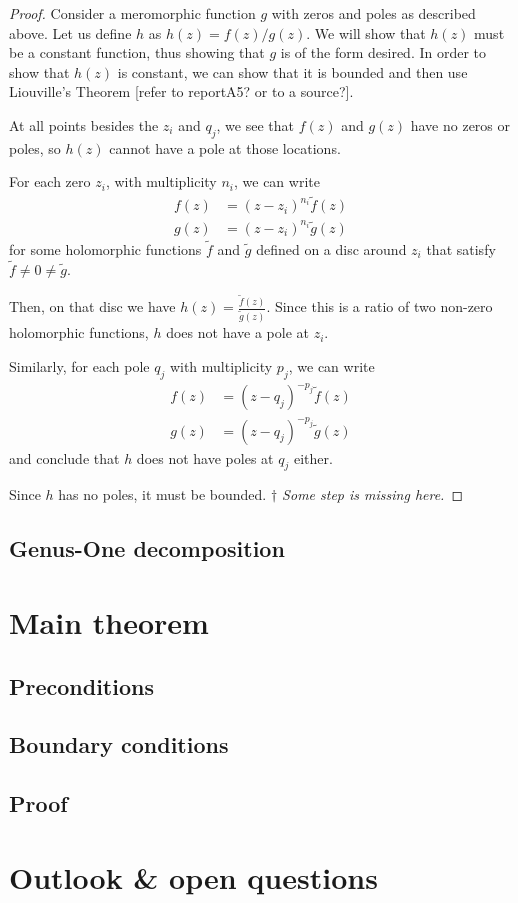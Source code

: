 \begin{proof}
    Consider a meromorphic function $g$ with zeros and poles as described above. Let us define $h$ as $h(z) = f(z) / g(z)$. We will show that $h(z)$ must be a constant function, thus showing that $g$ is of the form desired. In order to show that $h(z)$ is constant, we can show that it is bounded and then use Liouville's Theorem [refer to reportA5? or to a source?].

    At all points besides the $z_i$ and $q_j$, we see that $f(z)$ and $g(z)$ have no zeros or poles, so $h(z)$ cannot have a pole at those locations.

    For each zero $z_i$, with multiplicity $n_i$, we can write
    \begin{align}
        f(z) &= (z-z_i)^{n_i} \tilde f(z) \\
        g(z) &= (z-z_i)^{n_i} \tilde g(z)
    \end{align}
    for some holomorphic functions $\tilde f$ and $\tilde g$ defined on a disc around $z_i$ that satisfy $\tilde f \neq 0 \neq \tilde g$.

    Then, on that disc we have $h(z) = \frac{\tilde f(z)}{\tilde g(z)}$. Since this is a ratio of two non-zero holomorphic functions, $h$ does not have a pole at $z_i$.

    Similarly, for each pole $q_j$ with multiplicity $p_j$, we can write
    \begin{align}
        f(z) &= (z-q_j)^{-p_j} \tilde f(z) \\
        g(z) &= (z-q_j)^{-p_j} \tilde g(z)
    \end{align}
    and conclude that $h$ does not have poles at $q_j$ either.

    Since $h$ has no poles, it must be bounded. \emph{$\dagger$ Some step is missing here.}
\end{proof}

\subsection{Genus-One decomposition}

\section{Main theorem}
\subsection{Preconditions}
\subsection{Boundary conditions}
\subsection{Proof}
\section{Outlook \& open questions}


